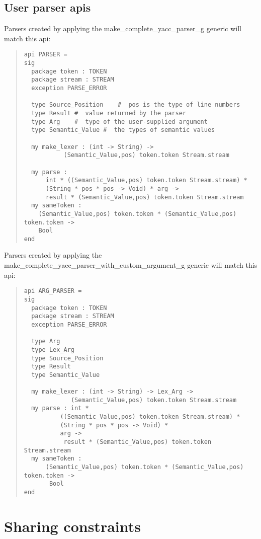 \subsection{User parser apis}

Parsers created by applying the make_complete_yacc_parser_g generic will match this api:
\begin{quote}
\begin{verbatim}
api PARSER =
sig
  package token : TOKEN
  package stream : STREAM
  exception PARSE_ERROR

  type Source_Position    #  pos is the type of line numbers 
  type Result #  value returned by the parser 
  type Arg    #  type of the user-supplied argument  
  type Semantic_Value #  the types of semantic values 

  my make_lexer : (int -> String) ->
		   (Semantic_Value,pos) token.token Stream.stream

  my parse :
      int * ((Semantic_Value,pos) token.token Stream.stream) *
      (String * pos * pos -> Void) * arg ->
	  result * (Semantic_Value,pos) token.token Stream.stream
  my sameToken :
    (Semantic_Value,pos) token.token * (Semantic_Value,pos) token.token ->
	Bool
end
\end{verbatim}
\end{quote}
Parsers created by applying the make_complete_yacc_parser_with_custom_argument_g generic will match this
api:
\begin{quote}
\begin{verbatim}
api ARG_PARSER = 
sig
  package token : TOKEN
  package stream : STREAM
  exception PARSE_ERROR

  type Arg
  type Lex_Arg
  type Source_Position
  type Result
  type Semantic_Value

  my make_lexer : (int -> String) -> Lex_Arg ->
		     (Semantic_Value,pos) token.token Stream.stream
  my parse : int *
	      ((Semantic_Value,pos) token.token Stream.stream) *
	      (String * pos * pos -> Void) *
	      arg ->
	       result * (Semantic_Value,pos) token.token Stream.stream
  my sameToken :
      (Semantic_Value,pos) token.token * (Semantic_Value,pos) token.token ->
	   Bool
end
\end{verbatim}
\end{quote}

\section{Sharing constraints}

